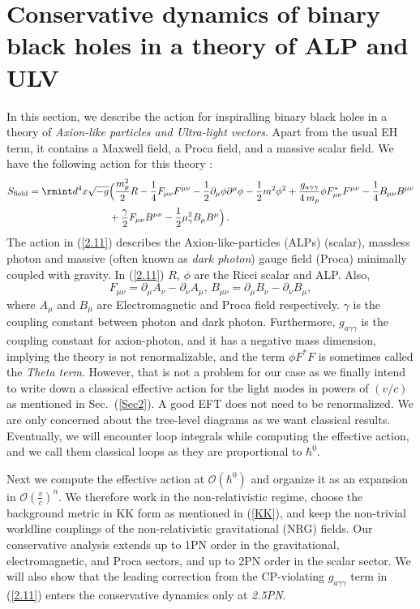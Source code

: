 \section{Conservative dynamics of binary black holes in a theory of ALP and ULV }\label{Sec4}
In this section, we describe the action for inspiralling binary black holes in a theory of \textit{Axion-like particles and Ultra-light vectors}. Apart from the usual EH term, it contains a Maxwell field, a Proca field, and a massive scalar field.  We have the following action for this theory \cite{Cardoso:2018tly}:
\begin{align}
\begin{split}
S_{\text{field}}=\rmint d^4x\sqrt{-g}&\Big(\frac{m_{p}^2}{2}R-\frac{1}{4}F_{\mu\nu}F^{\mu\nu}-\frac{1}{2}\partial_\mu\phi\partial^\mu\phi-\frac{1}{2}m^2\phi^2+\frac{g_{a\gamma\gamma}}{4\,m_{p}}\phi F_{\mu\nu}^*F^{\mu\nu}-\frac{1}{4}B_{\mu\nu}B^{\mu\nu}\\ &
+\frac{\gamma}{2}F_{\mu\nu}B^{\mu\nu}
-\frac{1}{2}\mu_{\gamma}^2B_{\mu}B^{\mu}\Big)\,.
\label{2.11}
\end{split}
\end{align}
The action in (\ref{2.11}) describes the Axion-like-particles (ALPs) (scalar), massless photon and massive (often known as \textit{dark photon}) gauge field (Proca) minimally coupled with gravity. In (\ref{2.11}) $R,\, \phi $ are the Ricci scalar and ALP. Also, 
$$F_{\mu\nu}=\partial_{\mu} {A}_{\nu}-\partial_{\nu} {A}_{\mu},\, B_{\mu\nu}=\partial_{\mu} {B}_{\nu}-\partial_{\nu} {B}_{\mu},$$ where ${A}_{\mu}$ and ${B}_{\mu}$ are Electromagnetic and Proca field respectively. $\gamma$ is the coupling constant between photon and dark photon. Furthermore, $g_{a\gamma\gamma}$ is the coupling constant for axion-photon, and it has a negative mass dimension, implying the theory is not renormalizable, and the term $\phi F^{*} F$ is sometimes called the \textit{Theta term}. However, that is not a problem for our case as we finally intend to write down a classical effective action for the light modes in powers of $(v/c)$ as mentioned in Sec.~(\ref{Sec2}). A good EFT does not need to be renormalized. We are only concerned about the tree-level diagrams as we want classical results. Eventually, we will encounter loop integrals while computing the effective action, and we call them classical loops as they are proportional to $\hbar ^0$. \par

Next we compute the effective action at $\mathcal{O}{(\hbar^0)}$ and organize it as an expansion in $\mathcal{O}(\frac{v}{c})^n$. We therefore work in the non-relativistic regime, choose the background metric in KK form as mentioned in (\ref{KK}), and keep the non-trivial worldline couplings of the non-relativistic gravitational (NRG) fields. Our conservative analysis extends up to 1PN order in the gravitational, electromagnetic, and Proca sectors, and up to 2PN order in the scalar sector. We will also show that the leading correction from the CP-violating $g_{a\gamma\gamma}$ term in (\ref{2.11}) enters the conservative dynamics only at \textit{2.5PN}. \par

